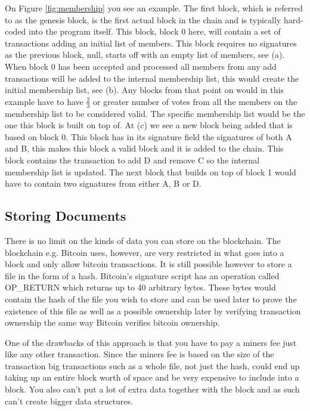 \documentclass[11pt]{article}
\begin{document}
On Figure \ref{fig:membership} you see an example. The first block, which is referred to as the genesis block, is the first actual block in the chain and is typically hard-coded into the program itself. This block, block 0 here, will contain a set of transactions adding an initial list of members. This block requires no signatures as the previous block, null, starts off with an empty list of members, see (a). When block 0 has been accepted and processed all members from any add transactions will be added to the internal membership list, this would create the initial membership list, see (b). Any blocks from that point on would in this example have to have $\frac{2}{3}$ or greater number of votes from all the members on the membership list to be considered valid. The specific membership list would be the one this block is built on top of. At (c) we see a new block being added that is based on block 0. This block has in its signature field the signatures of both A and B, this makes this block a valid block and it is added to the chain. This block contains the transaction to add D and remove C so the internal membership list is updated. The next block that builds on top of block 1 would have to contain two signatures from either A, B or D.

\subsection{Storing Documents}

There is no limit on the kinds of data you can store on the blockchain. The blockchain e.g. Bitcoin uses, however, are very restricted in what goes into a block and only allow bitcoin transactions. It is still possible however to store a file in the form of a hash. Bitcoin's signature script has an operation called OP\_RETURN which returns up to 40 arbitrary bytes. These bytes would contain the hash of the file you wish to store and can be used later to prove the existence of this file as well as a possible ownership later by verifying transaction ownership the same way Bitcoin verifies bitcoin ownership.

One of the drawbacks of this approach is that you have to pay a miners fee just like any other transaction. Since the miners fee is based on the size of the transaction big transactions such as a whole file, not just the hash, could end up taking up an entire block worth of space and be very expensive to include into a block. You also can't put a lot of extra data together with the block and as such can't create bigger data structures.
\end{document}
